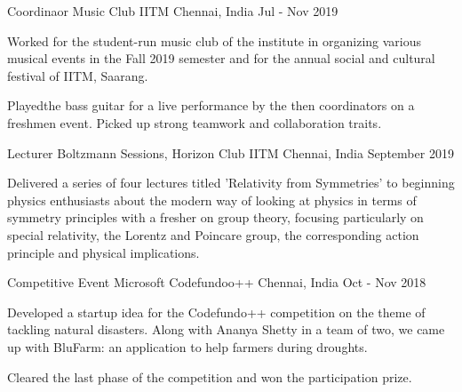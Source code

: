 

\begin{cventries}

  \cventry
    {Coordinaor} %
    {Music Club IITM} %
    {Chennai, India} %
    {Jul - Nov 2019} %
    {
      \begin{cvitems} %
        \item {Worked for the student-run music club of the institute in organizing various musical events in the Fall 2019 semester and for the annual social and cultural festival of IITM, Saarang.}
        \item {Playedthe bass guitar for a live performance by the then coordinators on a freshmen event. Picked up strong teamwork and collaboration traits.}
      \end{cvitems}
    }

    \vspace{1ex}

  \cventry
    {Lecturer} %
    {Boltzmann Sessions, Horizon Club IITM} %
    {Chennai, India} %
    {September 2019} %
    {
      \begin{cvitems} %
        \item {Delivered a series of four lectures titled 'Relativity from Symmetries' to beginning physics enthusiasts about the modern way of looking at physics in terms of symmetry principles with a fresher on group theory, focusing particularly on special relativity, the Lorentz and Poincare group, the corresponding action principle and physical implications.}
      \end{cvitems}
    }

    \vspace{1ex}

  \cventry
    {Competitive Event} %
    {Microsoft Codefundoo++} %
    {Chennai, India} %
    {Oct - Nov 2018} %
    {
      \begin{cvitems} %
        \item {Developed a startup idea for the Codefundo++ competition on the theme of tackling natural
        disasters. Along with Ananya Shetty in a team of two, we came up with BluFarm: an application
        to help farmers during droughts.}
        \item {Cleared the last phase of the competition and won the participation
        prize.}
      \end{cvitems}
    }


\end{cventries}
